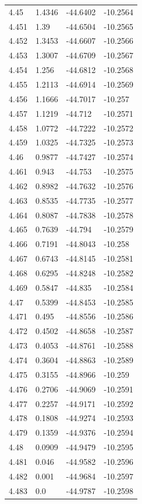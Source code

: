 \begin{tabular}{llll}
4.45 & 1.4346 & -44.6402 & -10.2564 \\
4.451 & 1.39 & -44.6504 & -10.2565 \\
4.452 & 1.3453 & -44.6607 & -10.2566 \\
4.453 & 1.3007 & -44.6709 & -10.2567 \\
4.454 & 1.256 & -44.6812 & -10.2568 \\
4.455 & 1.2113 & -44.6914 & -10.2569 \\
4.456 & 1.1666 & -44.7017 & -10.257 \\
4.457 & 1.1219 & -44.712 & -10.2571 \\
4.458 & 1.0772 & -44.7222 & -10.2572 \\
4.459 & 1.0325 & -44.7325 & -10.2573 \\
4.46 & 0.9877 & -44.7427 & -10.2574 \\
4.461 & 0.943 & -44.753 & -10.2575 \\
4.462 & 0.8982 & -44.7632 & -10.2576 \\
4.463 & 0.8535 & -44.7735 & -10.2577 \\
4.464 & 0.8087 & -44.7838 & -10.2578 \\
4.465 & 0.7639 & -44.794 & -10.2579 \\
4.466 & 0.7191 & -44.8043 & -10.258 \\
4.467 & 0.6743 & -44.8145 & -10.2581 \\
4.468 & 0.6295 & -44.8248 & -10.2582 \\
4.469 & 0.5847 & -44.835 & -10.2584 \\
4.47 & 0.5399 & -44.8453 & -10.2585 \\
4.471 & 0.495 & -44.8556 & -10.2586 \\
4.472 & 0.4502 & -44.8658 & -10.2587 \\
4.473 & 0.4053 & -44.8761 & -10.2588 \\
4.474 & 0.3604 & -44.8863 & -10.2589 \\
4.475 & 0.3155 & -44.8966 & -10.259 \\
4.476 & 0.2706 & -44.9069 & -10.2591 \\
4.477 & 0.2257 & -44.9171 & -10.2592 \\
4.478 & 0.1808 & -44.9274 & -10.2593 \\
4.479 & 0.1359 & -44.9376 & -10.2594 \\
4.48 & 0.0909 & -44.9479 & -10.2595 \\
4.481 & 0.046 & -44.9582 & -10.2596 \\
4.482 & 0.001 & -44.9684 & -10.2597 \\
4.483 & 0.0 & -44.9787 & -10.2598 \\
\bottomrule
\end{tabular}

